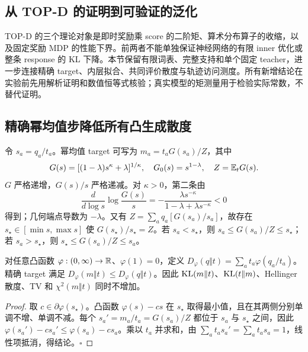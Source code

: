 \subsection{从 TOP-D 的证明到可验证的泛化}

TOP-D 的三个理论对象是即时奖励乘 score 的二阶矩、算术分布算子的收缩，以及固定奖励 MDP 的性能下界。前两者不能单独保证神经网络的有限 inner 优化或整条 response 的 KL 下降。本节保留有限词表、完整支持和单个固定 teacher，进一步连接精确 target、内层拟合、共同评价散度与轨迹访问测度。所有新增结论在实验前先用解析证明和数值恒等式核验；真实模型的矩测量用于检验实际常数，不替代证明。

\subsection{精确幂均值步降低所有凸生成散度}

令 $s_a=q_a/t_a$。幂均值 target 可写为 $m_a=t_aG(s_a)/Z$，其中
\begin{equation}
 G(s)=[(1-\lambda)s^\kappa+\lambda]^{1/\kappa},\quad
 G_0(s)=s^{1-\lambda},\quad Z=\mathbb E_tG(s).
\end{equation}
$G$ 严格递增，$G(s)/s$ 严格递减。对 $\kappa>0$，第二条由
\begin{equation}
 \frac{d}{d\log s}\log\frac{G(s)}s
 =-\frac{\lambda s^{-\kappa}}{1-\lambda+\lambda s^{-\kappa}}<0
\end{equation}
得到；几何端点导数为 $-\lambda$。又有 $Z=\sum_aq_a[G(s_a)/s_a]$，故存在 $s_\star\in[\min s,\max s]$ 使 $G(s_\star)/s_\star=Z$。若 $s_a<s_\star$，则 $s_a\le G(s_a)/Z\le s_\star$；若 $s_a>s_\star$，则 $s_\star\le G(s_a)/Z\le s_a$。

\begin{theorem}[单教师的凸生成散度单调性]
\label{thm:proximal-all-f-divergences}
对任意凸函数 $\varphi:(0,\infty)\to\mathbb R$、$\varphi(1)=0$，定义 $D_\varphi(q\Vert t)=\sum_at_a\varphi(q_a/t_a)$。精确 target 满足 $D_\varphi(m\Vert t)\le D_\varphi(q\Vert t)$。因此 $\operatorname{KL}(m\Vert t)$、$\operatorname{KL}(t\Vert m)$、Hellinger 散度、TV 和 $\chi^2(m\Vert t)$ 同时不增加。
\end{theorem}

\begin{proof}
取 $c\in\partial\varphi(s_\star)$。凸函数 $\varphi(s)-cs$ 在 $s_\star$ 取得最小值，且在其两侧分别单调不增、单调不减。每个 $s_a'=m_a/t_a=G(s_a)/Z$ 都位于 $s_a$ 与 $s_\star$ 之间，因此 $\varphi(s_a')-cs_a'\le\varphi(s_a)-cs_a$。乘以 $t_a$ 并求和，由 $\sum_at_as_a'=\sum_at_as_a=1$，线性项抵消，得结论。\hfill$\square$
\end{proof}

